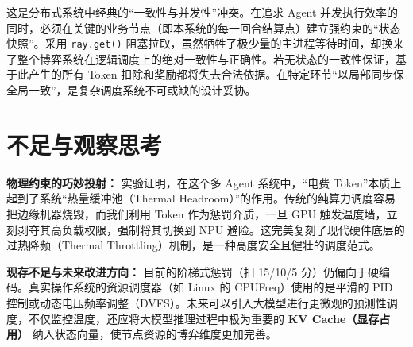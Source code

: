 \documentclass[11pt,a4paper]{ctexart}
\begin{document}
\begin{tcolorbox}[reflectionbox]
这是分布式系统中经典的“一致性与并发性”冲突。在追求 Agent 并发执行效率的同时，必须在关键的业务节点（即本系统的每一回合结算点）建立强约束的“状态快照”。采用 \texttt{ray.get()} 阻塞拉取，虽然牺牲了极少量的主进程等待时间，却换来了整个博弈系统在逻辑调度上的绝对一致性与正确性。若无状态的一致性保证，基于此产生的所有 Token 扣除和奖励都将失去合法依据。在特定环节“以局部同步保全局一致”，是复杂调度系统不可或缺的设计妥协。
\end{tcolorbox}

\section{不足与观察思考}

\begin{tcolorbox}[reflectionbox]
\textbf{物理约束的巧妙投射：}
实验证明，在这个多 Agent 系统中，“电费 Token”本质上起到了系统“热量缓冲池（Thermal Headroom）”的作用。传统的纯算力调度容易把边缘机器烧毁，而我们利用 Token 作为惩罚介质，一旦 GPU 触发温度墙，立刻剥夺其高负载权限，强制将其切换到 NPU 避险。这完美复刻了现代硬件底层的过热降频（Thermal Throttling）机制，是一种高度安全且健壮的调度范式。

\textbf{现存不足与未来改进方向：}
目前的阶梯式惩罚（扣 15/10/5 分）仍偏向于硬编码。真实操作系统的资源调度器（如 Linux 的 CPUFreq）使用的是平滑的 PID 控制或动态电压频率调整（DVFS）。未来可以引入大模型进行更微观的预测性调度，不仅监控温度，还应将大模型推理过程中极为重要的 \textbf{KV Cache（显存占用）} 纳入状态向量，使节点资源的博弈维度更加完善。
\end{tcolorbox}

\renewcommand{\refname}{参考文献}
\end{document}
